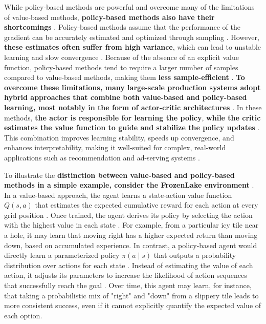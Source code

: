 \documentclass[final]{anthology-ch}         %
\begin{document}
While policy-based methods are powerful and overcome many of the limitations of value-based methods, \textbf{policy-based methods also have their shortcomings} \cite{Sutton1998, levine2020offline}. Policy-based methods assume that the performance of the gradient can be accurately estimated and optimized through sampling \cite{williams1992simple, Sutton1998}. However,\textbf{ these estimates often suffer from high variance}, which can lead to unstable learning and slow convergence \cite{Sutton1998, schulman2015trust}. Because of the absence of an explicit value function, policy-based methods tend to require a larger number of samples compared to value-based methods, making them \textbf{less sample-efficient} \cite{levine2020offline, dulac2019challenges}. \textbf{To overcome these limitations, many large-scale production systems adopt hybrid approaches that combine both value-based and policy-based learning, most notably in the form of actor-critic architectures} \cite{Sutton1998, chen2022off, gauci2018horizon}. In these methods, \textbf{the actor is responsible for learning the policy}, \textbf{while the critic estimates the value function to guide and stabilize the policy updates} \cite{Sutton1998, williams1992simple}. This combination improves learning stability, speeds up convergence, and enhances interpretability, making it well-suited for complex, real-world applications such as recommendation and ad-serving systems \cite{chen2022off, gauci2018horizon, dulac2019challenges}.

To illustrate the \textbf{distinction between value-based and policy-based methods in a simple example, consider the FrozenLake environment} \cite{frozenlake}. In a value-based approach, the agent learns a state-action value function \( Q(s, a) \) that estimates the expected cumulative reward for each action at every grid position \cite{Sutton1998, kaelbling1996reinforcement}. Once trained, the agent derives its policy by selecting the action with the highest value in each state \cite{Sutton1998}. For example, from a particular icy tile near a hole, it may learn that moving right has a higher expected return than moving down, based on accumulated experience. In contrast, a policy-based agent would directly learn a parameterized policy \( \pi(a \mid s) \) that outputs a probability distribution over actions for each state \cite{Sutton1998, williams1992simple}. Instead of estimating the value of each action, it adjusts its parameters to increase the likelihood of action sequences that successfully reach the goal \cite{williams1992simple, Sutton1998}. Over time, this agent may learn, for instance, that taking a probabilistic mix of "right" and "down" from a slippery tile leads to more consistent success, even if it cannot explicitly quantify the expected value of each option.
\end{document}
